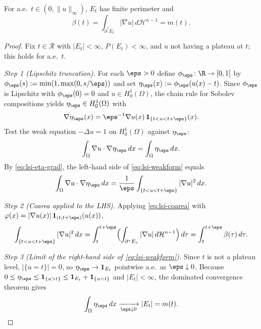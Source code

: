 \begin{lemma}\label{lem:flux}
For a.e.\ $t\in(0,\|u\|_{\infty})$, $E_{t}$ has finite perimeter and
\begin{equation}\label{eq:lsi-L2}
   \beta(t)
   =\int_{\partial^{*}E_{t}}|\nabla u|\,d\mathcal H^{n-1}
   =m(t).
\end{equation}
\end{lemma}

\begin{proof}
Fix $t\in\mathcal R$ with $|E_{t}|<\infty$, $P(E_{t})<\infty$, and $u$
not having a plateau at $t$; this holds for a.e.\ $t$.

\smallskip\noindent
\emph{Step 1 (Lipschitz truncation).}
For each $\eps>0$ define
$\phi_{\eps}\colon\R\to[0,1]$ by
$\phi_{\eps}(s):=\min(1,\max(0,s/\eps))$ and set
$\eta_{\eps}(x):=\phi_{\eps}(u(x)-t)$. Since $\phi_{\eps}$ is Lipschitz
with $\phi_{\eps}(0)=0$ and $u\in H^{1}_{0}(\Omega)$, the chain rule for
Sobolev compositions \cite[Theorem 3.99]{AFP2000} yields
$\eta_{\eps}\in H^{1}_{0}(\Omega)$ with
\begin{equation}\label{eq:lsi-eta-grad}
   \nabla\eta_{\eps}(x)
   =\eps^{-1}\nabla u(x)\,\mathbf 1_{\{t<u<t+\eps\}}(x).
\end{equation}
Test the weak equation $-\Delta u=1$ on $H^{1}_{0}(\Omega)$ against
$\eta_{\eps}$:
\begin{equation}\label{eq:lsi-weakform}
   \int_{\Omega}\nabla u\cdot\nabla\eta_{\eps}\,dx
   =\int_{\Omega}\eta_{\eps}\,dx.
\end{equation}
By \eqref{eq:lsi-eta-grad}, the left-hand side of \eqref{eq:lsi-weakform}
equals
\begin{equation}\label{eq:lsi-LHS}
   \int_{\Omega}\nabla u\cdot\nabla\eta_{\eps}\,dx
   =\frac{1}{\eps}\int_{\{t<u<t+\eps\}}|\nabla u|^{2}\,dx.
\end{equation}

\smallskip\noindent
\emph{Step 2 (Coarea applied to the LHS).}
Applying \eqref{eq:lsi-coarea} with
$\varphi(x)=|\nabla u(x)|\,\mathbf 1_{(t,t+\eps)}(u(x))$,
\begin{equation}\label{eq:lsi-RHS-coarea}
   \int_{\{t<u<t+\eps\}}|\nabla u|^{2}\,dx
   =\int_{t}^{t+\eps}\Bigl(\int_{\partial^{*}E_{\tau}}
     |\nabla u|\,d\mathcal H^{n-1}\Bigr)\,d\tau
   =\int_{t}^{t+\eps}\beta(\tau)\,d\tau.
\end{equation}

\smallskip\noindent
\emph{Step 3 (Limit of the right-hand side of \eqref{eq:lsi-weakform}).}
Since $t$ is not a plateau level, $|\{u=t\}|=0$, so
$\eta_{\eps}\to\mathbf 1_{E_{t}}$ pointwise a.e.\ as $\eps\downarrow 0$.
Because $0\le\eta_{\eps}\le \mathbf 1_{\{u>t\}}\le \mathbf 1_{E_{t}}+\mathbf
1_{\{u=t\}}$ and $|E_{t}|<\infty$, the dominated convergence theorem
gives
\[
   \int_{\Omega}\eta_{\eps}\,dx
   \xrightarrow[\eps\downarrow 0]{}|E_{t}|=m(t).
\]


\end{proof}
